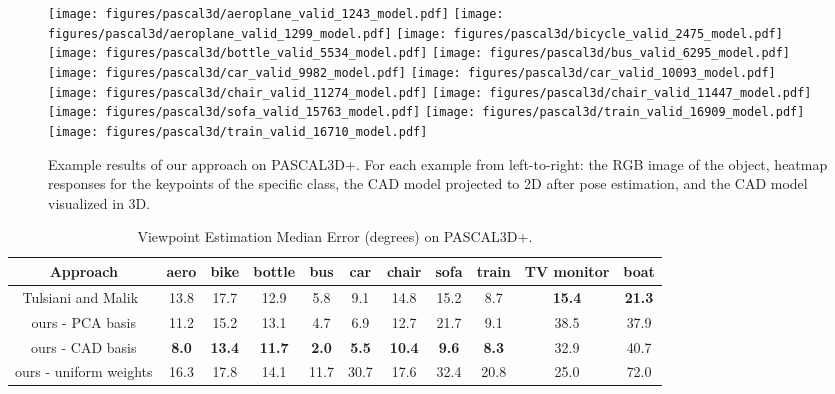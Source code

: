\documentclass[letterpaper, 10 pt, conference]{ieeeconf}
\begin{document}
\begin{figure*}
  \centering
  \texttt{[image: figures/pascal3d/aeroplane\_valid\_1243\_model.pdf]}
  \texttt{[image: figures/pascal3d/aeroplane\_valid\_1299\_model.pdf]}
  \texttt{[image: figures/pascal3d/bicycle\_valid\_2475\_model.pdf]}
  \texttt{[image: figures/pascal3d/bottle\_valid\_5534\_model.pdf]}
  \texttt{[image: figures/pascal3d/bus\_valid\_6295\_model.pdf]}
  \texttt{[image: figures/pascal3d/car\_valid\_9982\_model.pdf]}
  \texttt{[image: figures/pascal3d/car\_valid\_10093\_model.pdf]}
  \texttt{[image: figures/pascal3d/chair\_valid\_11274\_model.pdf]}
  \texttt{[image: figures/pascal3d/chair\_valid\_11447\_model.pdf]} 
  \texttt{[image: figures/pascal3d/sofa\_valid\_15763\_model.pdf]} 
   \texttt{[image: figures/pascal3d/train\_valid\_16909\_model.pdf]}
   \texttt{[image: figures/pascal3d/train\_valid\_16710\_model.pdf]}
  \caption{Example results of our approach on PASCAL3D+. For each example from left-to-right: 
the RGB image of the object, heatmap responses for the keypoints of the specific class, the CAD model projected to 2D after pose estimation, and the CAD model visualized in 3D.
}\label{fig:models3d}
\end{figure*}

\begin{table*}[t]
\caption{Viewpoint Estimation Median Error (degrees) on PASCAL3D+.}
\begin{center}
\begin{tabular}{c|cccccccccc}
\hline
   Approach    &     aero &       bike &  	 bottle &           bus &           car &         chair &	sofa &         train &         TV monitor  &	boat        \\
\hline
Tulsiani and Malik~\cite{tulsiani2015vk}	&         13.8 &         17.7 &     	12.9 &          5.8 &          9.1 &         14.8 &         15.2 &          8.7 &         {\bf 15.4} &    	{\bf 21.3}  \\
ours - PCA basis  &	11.2 &         15.2 &          13.1 &          4.7 &          6.9 &         12.7 &        21.7 &          9.1 &        38.5 &         37.9   \\
ours - CAD basis 	&   {\bf 8.0} &         {\bf 13.4} &        {\bf 11.7} &          {\bf 2.0} &          {\bf 5.5} &         {\bf 10.4} &          {\bf 9.6} &          {\bf 8.3} &          32.9 &         40.7 \\
ours - uniform weights 	&	16.3 &         17.8 &          14.1 &          11.7 &          30.7 &         17.6 &        32.4 &          20.8 &        25.0 &         72.0   \\
\hline
\end{tabular}
\end{center}
\label{tab:pascal3d}
\end{table*}
\end{document}
